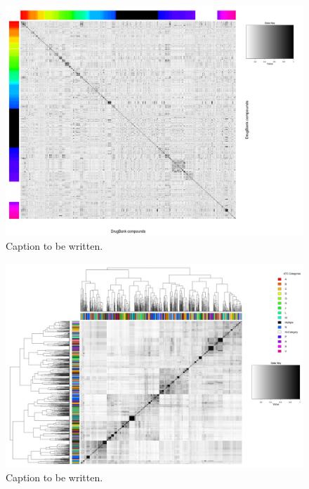 \documentclass{bioinfo}
\begin{document}
\begin{figure}[!tpb]%
\centerline{\includegraphics{figS3.png}}
\caption{Caption to be written.}\label{fig:S03}
\end{figure}

\begin{figure}[!tpb]%
\centerline{\includegraphics{figS4.png}}
\caption{Caption to be written.}\label{fig:S04}
\end{figure}
\end{document}
